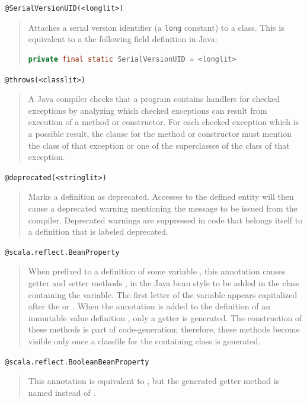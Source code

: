 \lstinline^@SerialVersionUID(<longlit>)^
\begin{quote}Attaches a serial version identifier (a
\lstinline^long^ constant) to a class.
This is equivalent to a the following field
definition in Java:
\begin{lstlisting}[language=Java]
  private final static SerialVersionUID = <longlit> 
\end{lstlisting}
\end{quote}

\lstinline^@throws(<classlit>)^
\begin{quote}
A Java compiler checks that a program contains handlers for checked exceptions
by analyzing which checked exceptions can result from execution of a method or
constructor. For each checked exception which is a possible result, the 
clause for the method or constructor must mention the class of that exception
or one of the superclasses of the class of that exception.
\end{quote}

\lstinline^@deprecated(<stringlit>)^
\begin{quote} Marks a definition as deprecated. Accesses to the
  defined entity will then cause a deprecated warning mentioning the
  message  to be issued from the compiler.  Deprecated
  warnings are suppressed in code that belongs itself to a definition
  that is labeled deprecated.
\end{quote}

\lstinline^@scala.reflect.BeanProperty^
\begin{quote}
When prefixed to a definition of some variable , this
annotation causes getter and setter methods , 
in the Java bean style to be added in the class containing the
variable. The first letter of the variable appears capitalized after
the  or . When the annotation is added to the
definition of an immutable value definition , only a getter is
generated. The construction of these methods is part of
code-generation; therefore, these methods become visible only once a
classfile for the containing class is generated.
\end{quote}

\lstinline^@scala.reflect.BooleanBeanProperty^
\begin{quote}
This annotation is equivalent to , but
the generated getter method is named  instead of .
\end{quote}

